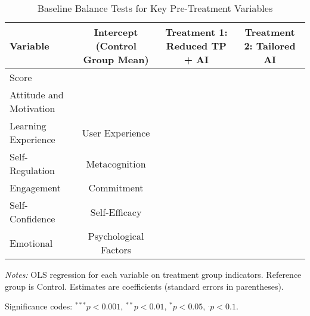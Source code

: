 \begin{table}[htbp]
\centering
\begin{threeparttable}
\caption{Baseline Balance Tests for Key Pre-Treatment Variables}
\label{tab:baseline_balance_detailed}
\scriptsize
\begin{tabular}{@{}lccc@{}}
\toprule
Variable & Intercept (Control Group Mean) & Treatment 1: Reduced TP + AI & Treatment 2: Tailored AI  \\
\midrule
Score &  &  &   \\
Attitude and Motivation &  &  &   \\
Learning Experience & User Experience &  &  &   \\
Self-Regulation & Metacognition &  &  &   \\
Engagement & Commitment &  &  &   \\
Self-Confidence & Self-Efficacy &  &  &   \\
Emotional & Psychological Factors &  &  &   \\
\bottomrule
\end{tabular}
\begin{tablenotes}
  \item[] \textit{Notes:} OLS regression for each variable on treatment group indicators. Reference group is Control. Estimates are coefficients (standard errors in parentheses). 
  \item[] Significance codes: $^{***} p<0.001$, $^{**} p<0.01$, $^{*} p<0.05$, $^{.} p<0.1$.
\end{tablenotes}
\end{threeparttable}
\end{table}
